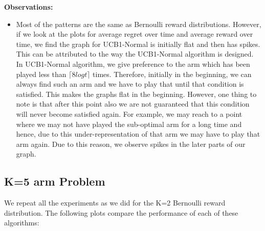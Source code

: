 \documentclass{article}
\begin{document}
		\textbf{Observations:}
		\begin{itemize}
			\item Most of the patterns are the same as Bernoulli reward distributions. However, if we look at the plots for average regret over time and average 
			reward over time, we find the graph for UCB1-Normal is initially flat and then has spikes. This can be attributed to the way the UCB1-Normal
			algorithm is designed. In UCB1-Normal algorithm, we give preference to the arm which has been played less than $\lceil 8 log t \rceil$ times. Therefore,
			initially in the beginning, we can always find such an arm and we have to play that until that condition is satisfied. This makes the graphs flat in 
			the beginning. However, one thing to note is that after this point also we are not guaranteed that this condition will never become satisfied again. For
			example, we may reach to a point where we may not have played the sub-optimal arm for a long time and hence, due to this under-representation of that arm
			we may have to play that arm again. Due to this reason, we observe spikes in the later parts of our graph.
		\end{itemize}
		
	\subsection{K=5 arm Problem}
		We repeat all the experiments as we did for the K=2 Bernoulli reward distribution. The following plots compare the performance of each of these algorithms:
		
\end{document}
